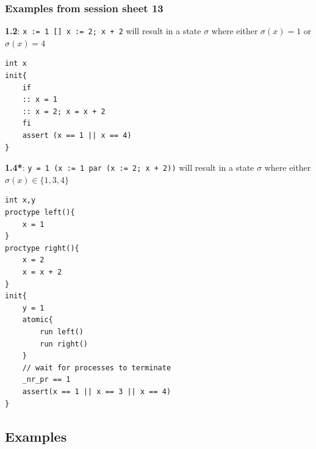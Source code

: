 \documentclass{article}
\begin{document}
\subsubsection{Examples from session sheet 13}
\textbf{1.2}: \texttt{x := 1 [] x := 2; x + 2} will result in a state $\sigma$ where either $\sigma(x)=1$ or $\sigma(x)=4$  
\begin{verbatim}
int x
init{
    if 
    :: x = 1
    :: x = 2; x = x + 2
    fi
    assert (x == 1 || x == 4)
}
\end{verbatim}
\textbf{1.4*}: \texttt{y = 1 (x := 1 par (x := 2; x + 2))} will result in a state $\sigma$ where either $\sigma(x)\in \{1,3,4\}$ 
\begin{verbatim}
int x,y
proctype left(){
    x = 1
}
proctype right(){
    x = 2
    x = x + 2
}
init{
    y = 1
    atomic{
        run left()
        run right() 
    }
    // wait for processes to terminate
    _nr_pr == 1
    assert(x == 1 || x == 3 || x == 4)
}
\end{verbatim}

\subsection{Examples}
\end{document}
